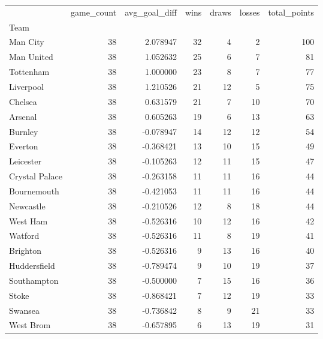 \begin{tabular}{lrrrrrr}
\toprule
{} &  game\_count &  avg\_goal\_diff &  wins &  draws &  losses &  total\_points \\
Team           &             &                &       &        &         &               \\
\midrule
Man City       &          38 &       2.078947 &    32 &      4 &       2 &           100 \\
Man United     &          38 &       1.052632 &    25 &      6 &       7 &            81 \\
Tottenham      &          38 &       1.000000 &    23 &      8 &       7 &            77 \\
Liverpool      &          38 &       1.210526 &    21 &     12 &       5 &            75 \\
Chelsea        &          38 &       0.631579 &    21 &      7 &      10 &            70 \\
Arsenal        &          38 &       0.605263 &    19 &      6 &      13 &            63 \\
Burnley        &          38 &      -0.078947 &    14 &     12 &      12 &            54 \\
Everton        &          38 &      -0.368421 &    13 &     10 &      15 &            49 \\
Leicester      &          38 &      -0.105263 &    12 &     11 &      15 &            47 \\
Crystal Palace &          38 &      -0.263158 &    11 &     11 &      16 &            44 \\
Bournemouth    &          38 &      -0.421053 &    11 &     11 &      16 &            44 \\
Newcastle      &          38 &      -0.210526 &    12 &      8 &      18 &            44 \\
West Ham       &          38 &      -0.526316 &    10 &     12 &      16 &            42 \\
Watford        &          38 &      -0.526316 &    11 &      8 &      19 &            41 \\
Brighton       &          38 &      -0.526316 &     9 &     13 &      16 &            40 \\
Huddersfield   &          38 &      -0.789474 &     9 &     10 &      19 &            37 \\
Southampton    &          38 &      -0.500000 &     7 &     15 &      16 &            36 \\
Stoke          &          38 &      -0.868421 &     7 &     12 &      19 &            33 \\
Swansea        &          38 &      -0.736842 &     8 &      9 &      21 &            33 \\
West Brom      &          38 &      -0.657895 &     6 &     13 &      19 &            31 \\
\bottomrule
\end{tabular}
